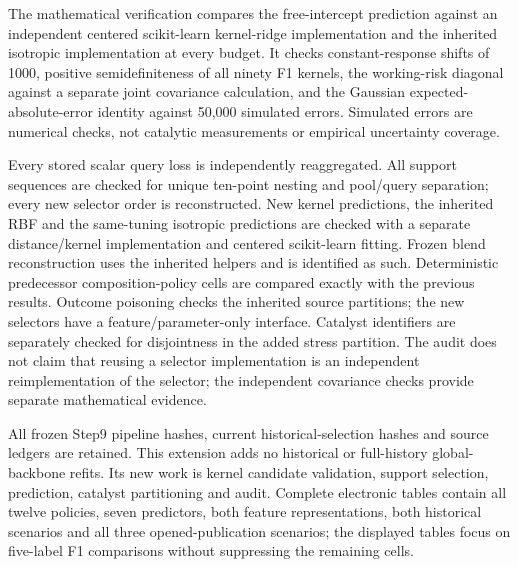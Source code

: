 The mathematical verification compares the free-intercept prediction against an independent centered scikit-learn kernel-ridge implementation and the inherited isotropic implementation at every budget. It checks constant-response shifts of 1000, positive semidefiniteness of all ninety F1 kernels, the working-risk diagonal against a separate joint covariance calculation, and the Gaussian expected-absolute-error identity against 50,000 simulated errors. Simulated errors are numerical checks, not catalytic measurements or empirical uncertainty coverage.

Every stored scalar query loss is independently reaggregated. All support sequences are checked for unique ten-point nesting and pool/query separation; every new selector order is reconstructed. New kernel predictions, the inherited RBF and the same-tuning isotropic predictions are checked with a separate distance/kernel implementation and centered scikit-learn fitting. Frozen blend reconstruction uses the inherited helpers and is identified as such. Deterministic predecessor composition-policy cells are compared exactly with the previous results. Outcome poisoning checks the inherited source partitions; the new selectors have a feature/parameter-only interface. Catalyst identifiers are separately checked for disjointness in the added stress partition. The audit does not claim that reusing a selector implementation is an independent reimplementation of the selector; the independent covariance checks provide separate mathematical evidence.

All frozen Step9 pipeline hashes, current historical-selection hashes and source ledgers are retained. This extension adds no historical or full-history global-backbone refits. Its new work is kernel candidate validation, support selection, prediction, catalyst partitioning and audit. Complete electronic tables contain all twelve policies, seven predictors, both feature representations, both historical scenarios and all three opened-publication scenarios; the displayed tables focus on five-label F1 comparisons without suppressing the remaining cells.
